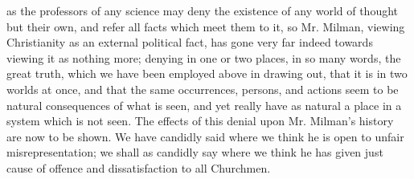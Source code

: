 as the professors of any science may deny the existence of any world
of thought but their own, and refer all facts which meet them to it,
so Mr. Milman, viewing Christianity as an external political fact, has
gone very far indeed towards viewing it as nothing more; denying in
one or two places, in so many words, the great truth, which we
have been employed above in drawing out, that it is in two worlds at
once, and that the same occurrences, persons, and actions seem to be
natural consequences of what is seen, and yet really have as natural a
place in a system which is not seen. The effects of this denial upon
Mr. Milman's history are now to be shown. We have candidly said where
we think he is open to unfair misrepresentation; we shall as candidly
say where we think he has given just cause of offence and
dissatisfaction to all Churchmen.

